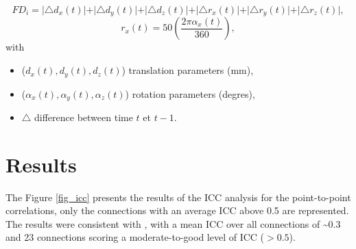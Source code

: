 \documentclass[authoryear]{elsarticle}
\begin{document}
\begin{equation}
    FD_{i} = \vert \triangle d_{x}(t) \vert + \vert \triangle d_{y}(t) \vert + \vert \triangle d_{z}(t) \vert + \vert \triangle r_x(t) \vert + \vert \triangle r_y(t) \vert + \vert \triangle r_z(t) \vert,
\end{equation}
\begin{equation}
  r_x(t) = 50\left(\frac{2\pi\alpha_x(t)}{360}\right),
\end{equation}
with 
\begin{itemize}
 \item ($d_x(t),d_{y}(t),d_{z}(t)$) translation parameters (mm),
 \item ($\alpha_x(t),\alpha_y(t),\alpha_z(t)$) rotation parameters (degres),
 \item $\triangle$ difference between time $t$ et $t-1$.
\end{itemize}

\section{Results}

The Figure \ref{fig_icc} presents the results of the ICC analysis for the point-to-point correlations, 
only the connections with an average ICC above 0.5 are represented. The results were consistent with \citep{Shehzad2009}, with a mean ICC over all connections of \textasciitilde0.3 and 23 connections scoring a moderate-to-good level of ICC ($>0.5$). 



\end{document}
